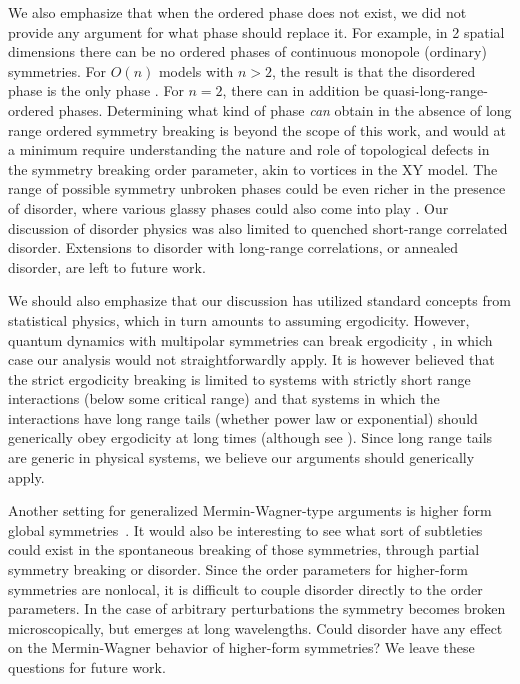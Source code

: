 \documentclass[pra,aps,twocolumn, amsfonts,amsmath,amssymb,nofootinbib,superscriptaddress]{revtex4-2}
\begin{document}
We also emphasize that when the ordered phase does not exist, we did not provide any argument for what phase should replace it. For example, in 2 spatial dimensions there can be no ordered phases of continuous monopole (ordinary) symmetries. For $O(n)$ models with $n>2$, the result is that the disordered phase is the only phase \cite{polyakov}. For $n=2$, there can in addition be quasi-long-range-ordered phases. Determining what kind of phase {\it can} obtain in the absence of long range ordered symmetry breaking is beyond the scope of this work, and would at a minimum require understanding the nature and role of topological defects in the symmetry breaking order parameter, akin to vortices in the XY model. The range of possible symmetry unbroken phases could be even richer in the presence of disorder, where various glassy phases could also come into play \cite{Fisheretal}. Our discussion of disorder physics was also limited to quenched short-range correlated disorder. Extensions to disorder with long-range correlations, or annealed disorder, are left to future work.

We should also emphasize that our discussion has utilized standard concepts from statistical physics, which in turn amounts to assuming  ergodicity. However, quantum dynamics with multipolar symmetries can break ergodicity \cite{KHN, Sala}, in which case our analysis would not straightforwardly apply. It is however believed that the strict ergodicity breaking is limited to systems with strictly short range interactions (below some critical range) and that systems in which the interactions have long range tails (whether power law or exponential) should generically obey ergodicity at long times (although see \cite{NS}). Since long range tails are generic in physical systems, we believe our arguments should generically apply.  

Another setting for generalized Mermin-Wagner-type arguments is higher form global symmetries~\cite{GKSW, Lake, Marvin}. It would also be interesting to see what sort of subtleties could exist in the spontaneous breaking of those symmetries, through partial symmetry breaking or disorder. Since the order parameters for higher-form symmetries are nonlocal, it is difficult to couple disorder directly to the order parameters. In the case of arbitrary perturbations the symmetry becomes broken microscopically, but emerges at long wavelengths. Could disorder have any effect on the Mermin-Wagner behavior of higher-form symmetries? We leave these questions for future work. 
\end{document}
